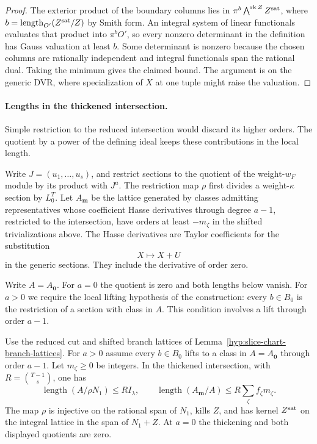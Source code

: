 \begin{proof}
The exterior product of the boundary columns lies in
\(\pi^b\bigwedge^{\operatorname{rk}Z} Z^{\rm sat}\), where
\(b=\operatorname{length}_{O'}(Z^{\rm sat}/Z)\) by Smith form.
An integral system of linear functionals evaluates that product
into \(\pi^b O'\), so every nonzero determinant in the
definition has Gauss valuation at least \(b\). Some determinant
is nonzero because the chosen columns are rationally independent
and integral functionals span the rational dual. Taking the
minimum gives the claimed bound. The argument is on the generic
DVR, where specialization of \(X\) at one tuple might raise the
valuation.

\end{proof}

\paragraph{Lengths in the thickened intersection.}

Simple restriction to the reduced intersection would discard its higher orders. The quotient by a power of the defining ideal keeps these contributions in the local length.

Write \(J=(u_1,\ldots,u_s)\), and restrict sections to the
quotient of the weight-\(w_F\) module by its product with \(J^a\).
The restriction map \(\rho\) first divides a weight-\(\kappa\)
section by \(L_0^T\). Let \(A_{\boldsymbol m}\) be the lattice
generated by classes admitting representatives whose coefficient
Hasse derivatives through degree \(a-1\), restricted to the
intersection, have orders at least \(-m_\zeta\) in the shifted
trivializations above. The Hasse derivatives are Taylor
coefficients for the substitution 
\[
  X\mapsto X+U
\]
 in the
generic sections. They include the derivative of order zero.

Write \(A=A_{\boldsymbol 0}\). For \(a=0\) the quotient is
zero and both lengths below vanish. For \(a>0\) we require
the local lifting hypothesis of the construction: every
\(b\in B_0\) is the restriction of a section with class in
\(A\). This condition involves a lift through order \(a-1\).

\begin{lemma}\label{lem:slice-thickening-length}
Use the reduced cut and shifted branch lattices of
Lemma~\ref{hyp:slice-chart-branch-lattices}. For \(a>0\)
assume every \(b\in B_0\) lifts to a class in \(A=A_{\boldsymbol 0}\)
through order \(a-1\). Let \(m_\zeta\ge0\) be integers. In the thickened intersection,
with \(R=\binom{T-1}{s}\), one has
\[
 \operatorname{length}(A/\rho N_1)\le R I_\lambda,\qquad
 \operatorname{length}(A_{\boldsymbol m}/A)\le
                             R\sum_\zeta f_\zeta m_\zeta .
\]
The map \(\rho\) is injective on the rational span of \(N_1\),
kills \(Z\), and has kernel \(Z^{\rm sat}\) on the integral
lattice in the span of \(N_1+Z\). At \(a=0\) the thickening
and both displayed quotients are zero.
\end{lemma}

